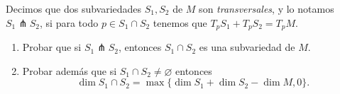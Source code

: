 \documentclass[12pt, a4paper]{amsart}
\theoremstyle{definition}
\let\emptyset\varnothing
\begin{document}
\begin{question}
Decimos que dos subvariedades $S_1, S_2$ de $M$ son \textit{transversales}, y lo notamos $S_1 \pitchfork S_2$, si para
todo $p\in S_1\cap S_2$ tenemos que $T_p S_1 + T_p S_2= T_p M$. 
\begin{enumerate}[label=\textbf{\alph*.}]
\item Probar que si $S_1\pitchfork S_2$, entonces $S_1 \cap S_2$ es una subvariedad de $M$. 
\item Probar además que si $S_1\cap S_2\neq\emptyset$ entonces $$\dim S_1 \cap S_2=\max\{\dim S_1 +\dim S_2 - \dim M,0\}.$$
\end{enumerate}
\end{question}
\end{document}
